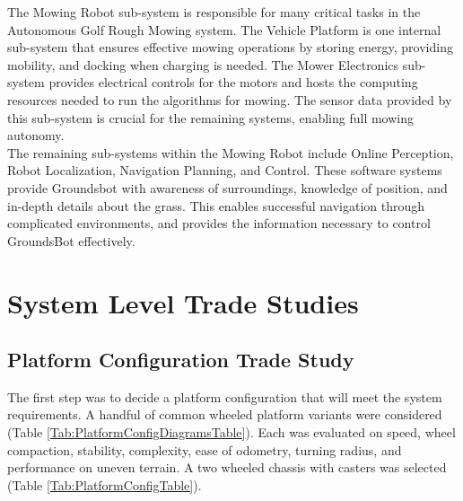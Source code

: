 \documentclass[12pt]{extarticle}
\begin{document}
  The Mowing Robot sub-system is responsible for many critical tasks in the Autonomous Golf Rough Mowing system. The Vehicle Platform is one internal sub-system that ensures effective mowing operations by storing energy, providing mobility, and docking when charging is needed. The Mower Electronics sub-system provides electrical controls for the motors and hosts the computing resources needed to run the algorithms for mowing. The sensor data provided by this sub-system is crucial for the remaining systems, enabling full mowing autonomy.\\
  
  The remaining sub-systems within the Mowing Robot include Online Perception, Robot Localization, Navigation Planning, and Control. These software systems provide Groundsbot with awareness of surroundings, knowledge of position, and in-depth details about the grass. This enables successful navigation through complicated environments, and provides the information necessary to control GroundsBot effectively.\\

\newpage
\section{System Level Trade Studies}
  \subsection{Platform Configuration Trade Study}
The first step was to decide a platform configuration that will meet the system requirements. A handful of common wheeled platform variants were considered (Table \ref{Tab:PlatformConfigDiagramsTable}). Each was evaluated on speed, wheel compaction, stability, complexity, ease of odometry, turning radius, and performance on uneven terrain. A two wheeled chassis with casters was selected (Table \ref{Tab:PlatformConfigTable}).
\end{document}
